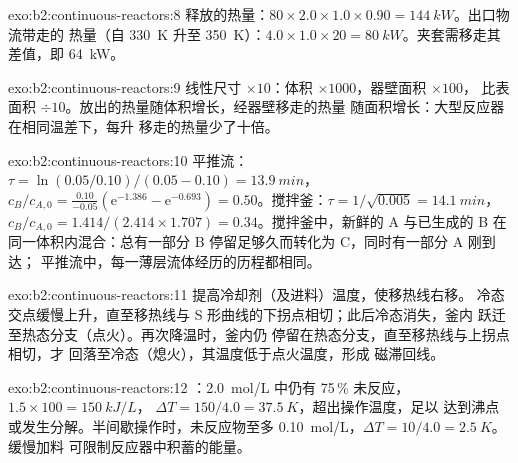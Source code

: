 \begin{solution}{exo:b2:continuous-reactors:8}
释放的热量：$80 \times 2.0 \times 1.0 \times 0.90 = \qty{144}{kW}$。出口物流带走的
热量（自 \qty{330}{K} 升至 \qty{350}{K}）：$4.0 \times 1.0 \times 20 =
\qty{80}{kW}$。夹套需移走其差值，即 \qty{64}{kW}。
\end{solution}

\begin{solution}{exo:b2:continuous-reactors:9}
线性尺寸 $\times 10$：体积 $\times 1000$，器壁面积 $\times 100$，
比表面积 $\div 10$。放出的热量随体积增长，经器壁移走的热量
随面积增长：大型反应器在相同温差下，每升
移走的热量少了十倍。
\end{solution}

\begin{solution}{exo:b2:continuous-reactors:10}
平推流：$\tau = \ln(0.05/0.10)/(0.05 - 0.10) = \qty{13.9}{min}$，$c_B/c_{A,0} =
\frac{0.10}{-0.05}(\mathrm e^{-1.386} - \mathrm e^{-0.693}) = 0.50$。搅拌釜：$\tau =
1/\sqrt{0.005} = \qty{14.1}{min}$，$c_B/c_{A,0} = 1.414/(2.414 \times 1.707) =
0.34$。搅拌釜中，新鲜的 A 与已生成的 B 在同一体积内混合：总有一部分
B 停留足够久而转化为 C，同时有一部分 A 刚到达；
平推流中，每一薄层流体经历的历程都相同。
\end{solution}

\begin{solution}{exo:b2:continuous-reactors:11}
提高冷却剂（及进料）温度，使移热线右移。
冷态交点缓慢上升，直至移热线与
S 形曲线的下拐点相切；此后冷态消失，釜内
跃迁至热态分支（点火）。再次降温时，釜内仍
停留在热态分支，直至移热线与上拐点相切，才
回落至冷态（熄火），其温度低于点火温度，形成
磁滞回线。
\end{solution}

\begin{solution}{exo:b2:continuous-reactors:12}
：\qty{2.0}{mol/L} 中仍有 75\,\% 未反应，$1.5 \times 100 = \qty{150}{kJ/L}$，
$\Delta T = 150/4.0 = \qty{37.5}{K}$，超出操作温度，足以
达到沸点或发生分解。半间歇操作时，未反应物至多
\qty{0.10}{mol/L}，$\Delta T = 10/4.0 = \qty{2.5}{K}$。缓慢加料
可限制反应器中积蓄的能量。
\end{solution}


